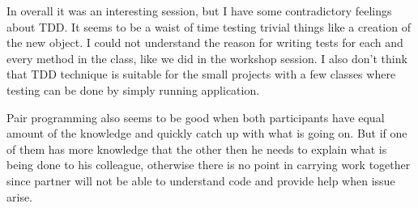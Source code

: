 \documentclass[]{report}
\begin{document}
In overall it was an interesting session, but I have some contradictory feelings about TDD. It seems to be a waist of time testing trivial things like a creation of the new object. I could not understand the reason for writing tests for each and every method in the class, like we did in the workshop session. I also don't think that TDD technique is suitable for the small projects with a few classes where testing can be done by simply running application. 

Pair programming also seems to be good when both participants have equal amount of the knowledge and quickly catch up with what is going on. But if one of them has more knowledge that the other then he needs to explain what is being done to his colleague, otherwise there is no point in carrying work together since partner will not be able to understand code and provide help when issue arise.  



\end{document}
